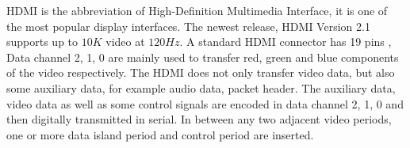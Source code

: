 \documentclass[]{spie}  %
\begin{document}
HDMI is the abbreviation of High-Definition Multimedia Interface, it is one of the most popular display interfaces. The newest release, HDMI Version 2.1 supports up to $10K$ video at $120 Hz$. A standard HDMI connector has 19 pins \cite{hdmi14}, Data channel 2, 1, 0 are mainly used to transfer red, green and blue components of the video respectively. The HDMI does not only transfer video data, but also some auxiliary data, for example audio data, packet header. The auxiliary data, video data as well as some control signals are encoded in data channel 2, 1, 0 and then digitally transmitted in serial. In between any two adjacent video periods, one or more data island period and control period are inserted. 

\end{document}
